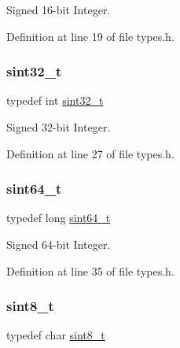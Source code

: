 Signed 16-\/bit Integer. 



Definition at line 19 of file types.\+h.

\mbox{\label{a00023_ad838970452fe561cb8e0550cac5336be_ad838970452fe561cb8e0550cac5336be}} 
\subsubsection{\texorpdfstring{sint32\+\_\+t}{sint32\_t}}
{\footnotesize\ttfamily typedef int \hyperlink{a00023_ad838970452fe561cb8e0550cac5336be_ad838970452fe561cb8e0550cac5336be}{sint32\+\_\+t}}



Signed 32-\/bit Integer. 



Definition at line 27 of file types.\+h.

\mbox{\label{a00023_a04761b9e7480e1e48b0d392da17fd5d4_a04761b9e7480e1e48b0d392da17fd5d4}} 
\subsubsection{\texorpdfstring{sint64\+\_\+t}{sint64\_t}}
{\footnotesize\ttfamily typedef long \hyperlink{a00023_a04761b9e7480e1e48b0d392da17fd5d4_a04761b9e7480e1e48b0d392da17fd5d4}{sint64\+\_\+t}}



Signed 64-\/bit Integer. 



Definition at line 35 of file types.\+h.

\mbox{\label{a00023_afa23178c4119f09bd4562a86b501f444_afa23178c4119f09bd4562a86b501f444}} 
\subsubsection{\texorpdfstring{sint8\+\_\+t}{sint8\_t}}
{\footnotesize\ttfamily typedef char \hyperlink{a00023_afa23178c4119f09bd4562a86b501f444_afa23178c4119f09bd4562a86b501f444}{sint8\+\_\+t}}



